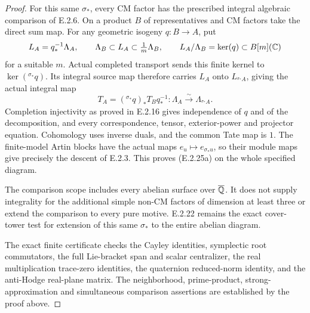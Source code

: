 \begin{proof}
For this same \(\sigma_*\), every CM factor has
the prescribed integral algebraic comparison of
E.2.6. On a product \(B\) of representatives and
CM factors take the direct sum map. For any
geometric isogeny \(q:B\to A\), put
\[
 L_A=q_*^{-1}\Lambda_A,
 \qquad \Lambda_B\subset L_A\subset\tfrac1m\Lambda_B,
 \qquad L_A/\Lambda_B=\ker(q)\subset B[m](\mathbb C)
\]
for a suitable \(m\). Actual completed transport
sends this finite kernel to \(\ker({}^{\sigma_*}q)\).
Its integral source map therefore carries \(L_A\)
onto \(L_{{}^{\sigma_*}A}\), giving the actual
integral map
\[
 T_A=({}^{\sigma_*}q)_*T_Bq_*^{-1}:
       \Lambda_A\xrightarrow{\sim}\Lambda_{{}^{\sigma_*}A}.
\]
Completion injectivity as proved in E.2.16 gives
independence of \(q\) and of the decomposition,
and every correspondence, tensor, exterior-power
and projector equation. Cohomology uses inverse
duals, and the common Tate map is \(1\). The
finite-model Artin blocks have the actual maps
\(e_u\mapsto e_{\sigma_*u}\), so their module
maps give precisely the descent of E.2.3.
This proves (E.2.25a) on the whole specified diagram.

The comparison scope includes every abelian surface
over \(\overline{\mathbb Q}\). It does not supply integrality for
the additional simple non-CM factors of dimension
at least three or extend the comparison to every
pure motive. E.2.22 remains the exact cover-tower
test for extension of this same \(\sigma_*\) to
the entire abelian diagram.

The exact finite certificate
 checks the
Cayley identities, symplectic root commutators,
the full Lie-bracket span and scalar centralizer,
the real multiplication trace-zero identities,
the quaternion reduced-norm identity, and the
anti-Hodge real-plane matrix. The neighborhood,
prime-product, strong-approximation and simultaneous
comparison assertions are established by the proof
above.
\end{proof}

